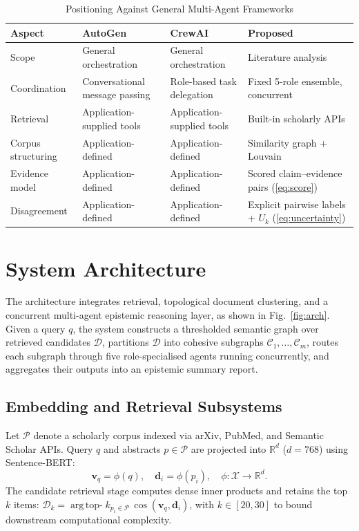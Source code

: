 \documentclass[conference]{IEEEtran}
\begin{document}
\begin{table}[!t]
\caption{Positioning Against General Multi-Agent Frameworks}
\label{tab:positioning}
\centering
\footnotesize
\setlength{\tabcolsep}{2.5pt}
\begin{tabular}{@{}L{1.15cm}L{1.85cm}L{1.85cm}L{2.55cm}@{}}
\toprule
\textbf{Aspect} & \textbf{AutoGen~\cite{wu2023autogen}} &
\textbf{CrewAI~\cite{moura2024crewai}} & \textbf{Proposed} \\
\midrule
Scope & General orchestration & General orchestration & Literature analysis \\
Coordination & Conversational message passing & Role-based task delegation &
Fixed 5-role ensemble, concurrent \\
Retrieval & Application-supplied tools & Application-supplied tools &
Built-in scholarly APIs \\
Corpus structuring & Application-defined & Application-defined &
Similarity graph + Louvain \\
Evidence model & Application-defined & Application-defined &
Scored claim--evidence pairs (\ref{eq:score}) \\
Disagreement & Application-defined & Application-defined &
Explicit pairwise labels + $U_k$ (\ref{eq:uncertainty}) \\
\bottomrule
\end{tabular}
\end{table}

\section{System Architecture}
The architecture integrates retrieval, topological document clustering, and
a concurrent multi-agent epistemic reasoning layer, as shown in
Fig.~\ref{fig:arch}. Given a query $q$, the system constructs a thresholded
semantic graph over retrieved candidates $\mathcal{D}$, partitions $\mathcal{D}$
into cohesive subgraphs $\mathcal{C}_1, \dots, \mathcal{C}_m$, routes each
subgraph through five role-specialised agents running concurrently, and
aggregates their outputs into an epistemic summary report.

\subsection{Embedding and Retrieval Subsystems}
Let $\mathcal{P}$ denote a scholarly corpus indexed via arXiv, PubMed, and
Semantic Scholar APIs. Query $q$ and abstracts $p \in \mathcal{P}$ are projected
into $\mathbb{R}^d$ ($d=768$) using Sentence-BERT:
\begin{equation}
\mathbf{v}_q = \phi(q), \quad \mathbf{d}_i = \phi(p_i), \quad \phi: \mathcal{X} \to \mathbb{R}^d.
\end{equation}
The candidate retrieval stage computes dense inner products and retains the top
$k$ items: $\mathcal{D}_k = \operatorname{arg\,top-}k_{p_i \in \mathcal{P}} \, \cos(\mathbf{v}_q, \mathbf{d}_i)$, with $k \in [20, 30]$ to bound downstream computational complexity.
\end{document}
